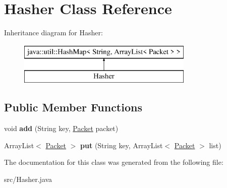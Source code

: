 \hypertarget{class_hasher}{\section{Hasher Class Reference}
\label{class_hasher}
}
Inheritance diagram for Hasher\-:\begin{figure}[H]
\begin{center}
\leavevmode
\includegraphics[height=2.000000cm]{class_hasher}
\end{center}
\end{figure}
\subsection*{Public Member Functions}
\begin{DoxyCompactItemize}
\item 
\hypertarget{class_hasher_aa9f27121ca5b6a51806eaa55ccf841f0}{void {\bfseries add} (String key, \hyperlink{class_packet}{Packet} packet)}\label{class_hasher_aa9f27121ca5b6a51806eaa55ccf841f0}

\item 
\hypertarget{class_hasher_a5a753730f82b945f0b076ce9cf9f3934}{Array\-List$<$ \hyperlink{class_packet}{Packet} $>$ {\bfseries put} (String key, Array\-List$<$ \hyperlink{class_packet}{Packet} $>$ list)}\label{class_hasher_a5a753730f82b945f0b076ce9cf9f3934}

\end{DoxyCompactItemize}


The documentation for this class was generated from the following file\-:\begin{DoxyCompactItemize}
\item 
src/Hasher.\-java\end{DoxyCompactItemize}
